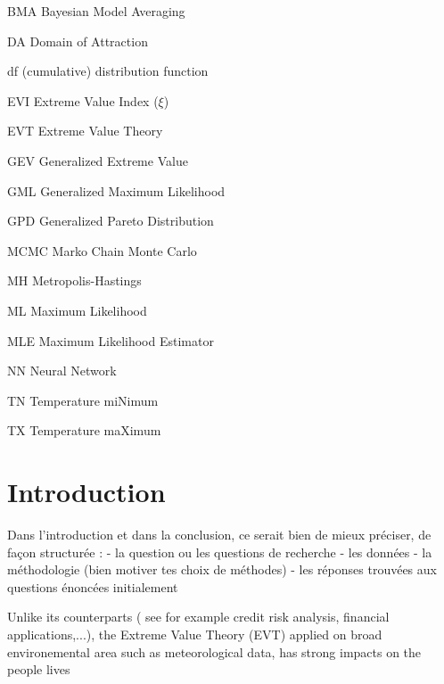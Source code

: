 \documentclass[11pt,a4paper,openany, twosided]{book}
\newcommand{\abbrlabel}[1]{\makebox[3cm][l]{\textbf{#1}\ \dotfill}}
\newenvironment{abbreviations}{\begin{list}{}{\renewcommand{\makelabel}{\abbrlabel}}}{\end{list}}
\newcommand\blankpage{%
    \null
    \thispagestyle{empty}%
    \addtocounter{page}{-1}%
    \newpage}
\begin{document}
\begin{center}
\begin{abbreviations}
	\item[BMA] Bayesian Model Averaging
	\item[DA] Domain of Attraction
	\item[df]\label{df}  (cumulative) distribution function
	\item[EVI] Extreme Value Index ($\xi$)
	\item[EVT] Extreme Value Theory
	\item[GEV] Generalized Extreme Value
	\item[GML] Generalized Maximum Likelihood
	\item[GPD] Generalized Pareto Distribution %
	\item[MCMC] Marko Chain Monte Carlo
	\item[MH] Metropolis-Hastings 
	\item[ML] Maximum Likelihood 
	\item[MLE] Maximum Likelihood Estimator
	\item[NN] Neural Network
	\item[TN] Temperature miNimum
	\item[TX] Temperature maXimum
	
\end{abbreviations}
\end{center}


\renewcommand\labelitemi{\normalsize$\bullet$}



\afterpage{\blankpage}


\chapter*{Introduction}
\thispagestyle{empty}



Dans l'introduction et dans la conclusion, ce serait bien de mieux préciser, de façon structurée :
- la question ou les questions de recherche
- les données
- la méthodologie (bien motiver tes choix de méthodes)
- les réponses trouvées aux questions énoncées initialement


Unlike its counterparts ( see for example credit risk analysis, financial applications,...), the Extreme Value Theory (EVT) applied on broad environemental area such as meteorological data, has strong impacts on the people lives 
\end{document}
